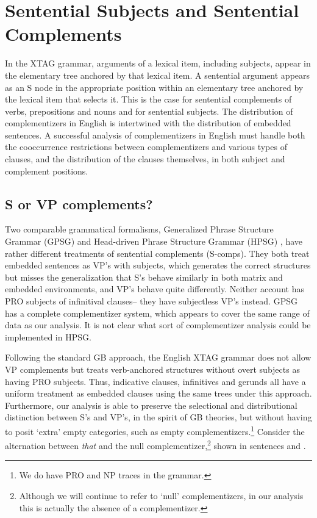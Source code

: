 
\chapter{Sentential Subjects and Sentential Complements}
\label{scomps-section}

In the XTAG grammar, arguments of a lexical item, including
subjects, appear in the elementary tree anchored by that lexical item.  A
sentential argument appears as an S node in the appropriate position
within an elementary tree anchored by the lexical item that selects
it. This is the case for sentential complements of verbs, prepositions
and nouns and for sentential subjects. The distribution of
complementizers in English is intertwined with the distribution of
embedded sentences.  A successful analysis of complementizers in
English must handle both the cooccurrence restrictions between
complementizers and various types of clauses, and the distribution of
the clauses themselves, in both subject and complement positions.

\section{S or VP complements?}
 
Two comparable grammatical formalisms, Generalized Phrase Structure
Grammar (GPSG) \cite{gazdar85} and Head-driven Phrase Structure
Grammar (HPSG) \cite{PollardSag94:BK}, have rather different
treatments of sentential complements (S-comps).  They both treat
embedded sentences as VP's with subjects, which generates the correct
structures but misses the generalization that S's behave similarly in
both matrix and embedded environments, and VP's behave quite
differently.  Neither account has PRO\label{PRO} subjects of
infinitival clauses-- they have subjectless VP's instead.  GPSG has a
complete complementizer system, which appears to cover the same range
of data as our analysis.  It is not clear what sort of complementizer
analysis could be implemented in HPSG.

Following the standard GB approach, the English XTAG grammar does not
allow VP complements but treats verb-anchored structures without overt
subjects as having PRO subjects. Thus, indicative clauses, infinitives
and gerunds all have a uniform treatment as embedded clauses using the
same trees under this approach. Furthermore, our analysis is able to
preserve the selectional and distributional distinction between S's and
VP's, in the spirit of GB theories, but without having to posit `extra'
empty categories, such as empty complementizers.\footnote{We do have PRO
and NP traces in the grammar.} Consider the alternation between {\it
that} and the null complementizer,\footnote{Although we will continue
to refer to `null' complementizers, in our analysis this is actually
the absence of a complementizer.} shown in sentences  and .

